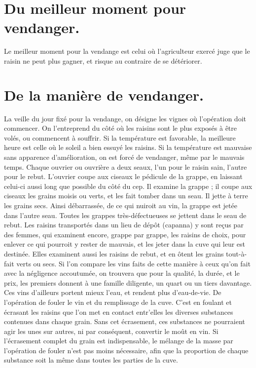\section{Du meilleur moment pour vendanger.}
Le meilleur moment pour la vendange est celui où l'agriculteur exercé juge que le raisin ne peut plus gagner, et risque au contraire de se détériorer.
\section{De la manière de vendanger.}
La veille du jour fixé pour la vendange, on désigne les vignes où l'opération doit commencer. On l'entreprend du côté où les raisins sont le plus exposés à être volés, ou commencent à souffrir.
Si la température est favorable, la meilleure heure est celle où le soleil a bien essuyé\setcounter{page}{87} les raisins. Si la température est mauvaise sans apparence d'amélioration, on est forcé de vendanger, même par le mauvais temps. Chaque ouvrier ou ouvrière a deux seaux, l'un pour le raisin sain, l'autre pour le rebut. L'ouvrier coupe aux ciseaux le pédicule de la grappe, en laissant celui-ci aussi long que possible du côté du cep. Il examine la grappe ; il coupe aux ciseaux les grains moisis ou verts, et les fait tomber dans un seau. Il jette à terre les grains secs. Ainsi débarrassée, de ce qui nuiroit au vin, la grappe est jetée dans l'autre seau. Toutes les grappes très-défectueuses se jettent dans le seau de rebut. Les raisins transportés dans un lieu de dépôt (capanna) y sont reçus par des femmes, qui examinent encore, grappe par grappe, les raisins de choix, pour enlever ce qui pourroit y rester de mauvais, et les jeter dans la cuve qui leur est destinée. Elles examinent aussi les raisins de rebut, et en ôtent les grains tout-à-fait verts ou secs.
Si l'on compare les vins faits de cette manière à ceux qu'on fait avec la négligence accoutumée, on trouvera que pour la qualité, la durée, et le prix, les premiers donnent à une famille diligente, un quart ou un tiers davantage. Ces vins d'ailleurs portent mieux l'eau, et rendent plus d'eau-de-vie.\setcounter{page}{88} De l'opération de fouler le vin et du remplissage de la cuve.
C'est en foulant et écrasant les raisins que l'on met en contact entr'elles les diverses substances contenues dans chaque grain. Sans cet écrasement, ces substances ne pourraient agir les unes sur autres, ni par conséquent, convertir le moût en vin.
Si l'écrasement complet du grain est indispensable, le mélange de la masse par l'opération de fouler n'est pas moins nécessaire, afin que la proportion de chaque substance soit la même dans toutes les parties de la cuve.
